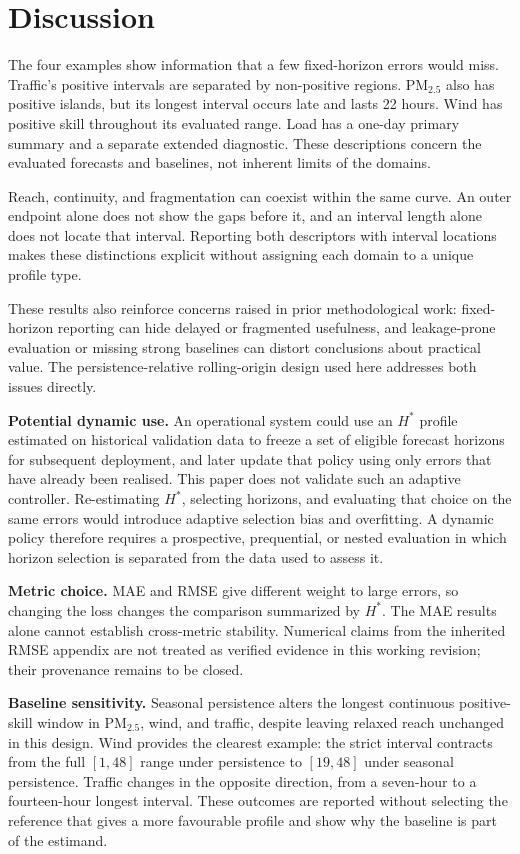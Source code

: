 \documentclass[pdflatex]{sn-jnl}
\begin{document}


\section{Discussion}
The four examples show information that a few fixed-horizon errors would
miss. Traffic's positive intervals are separated by non-positive regions.
PM$_{2.5}$ also has positive islands, but its longest interval occurs late
and lasts 22 hours. Wind has positive skill throughout its evaluated range.
Load has a one-day primary summary and a separate extended diagnostic.
These descriptions concern the evaluated forecasts and baselines, not
inherent limits of the domains.

Reach, continuity, and fragmentation can coexist within the same curve.
An outer endpoint alone does not show the gaps before it, and an interval
length alone does not locate that interval. Reporting both descriptors
with interval locations makes these distinctions explicit without
assigning each domain to a unique profile type.

These results also reinforce concerns raised in prior methodological work: fixed-horizon reporting can hide delayed or fragmented usefulness, and leakage-prone evaluation or missing strong baselines can distort conclusions about practical value. The persistence-relative rolling-origin design used here addresses both issues directly.

\textbf{Potential dynamic use.} An operational system could use an $H^*$
profile estimated on historical validation data to freeze a set of eligible
forecast horizons for subsequent deployment, and later update that policy
using only errors that have already been realised. This paper does not
validate such an adaptive controller. Re-estimating $H^*$, selecting horizons,
and evaluating that choice on the same errors would introduce adaptive
selection bias and overfitting. A dynamic policy therefore requires a
prospective, prequential, or nested evaluation in which horizon selection is
separated from the data used to assess it.

\textbf{Metric choice.} MAE and RMSE give different weight to large errors,
so changing the loss changes the comparison summarized by $H^*$. The
MAE results alone cannot establish cross-metric stability. Numerical
claims from the inherited RMSE appendix are not treated as verified
evidence in this working revision; their provenance remains to be closed.

\textbf{Baseline sensitivity.} Seasonal persistence alters the longest
continuous positive-skill window in PM$_{2.5}$, wind, and traffic, despite
leaving relaxed reach unchanged in this design. Wind provides the clearest
example: the strict interval contracts from the full $[1,48]$ range under
persistence to $[19,48]$ under seasonal persistence. Traffic changes in the
opposite direction, from a seven-hour to a fourteen-hour longest interval.
These outcomes are reported without selecting the reference that gives a more
favourable profile and show why the baseline is part of the estimand.
\end{document}
